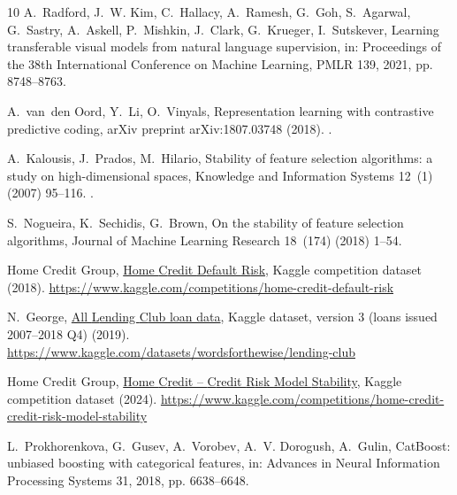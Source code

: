 \documentclass[final,5p,twocolumn]{elsarticle}
\begin{document}
\begin{thebibliography}{10}
A.~Radford, J.~W. Kim, C.~Hallacy, A.~Ramesh, G.~Goh, S.~Agarwal, G.~Sastry,
  A.~Askell, P.~Mishkin, J.~Clark, G.~Krueger, I.~Sutskever, Learning
  transferable visual models from natural language supervision, in: Proceedings
  of the 38th International Conference on Machine Learning, PMLR 139, 2021, pp.
  8748--8763.

A.~van~den Oord, Y.~Li, O.~Vinyals, Representation learning with contrastive
  predictive coding, arXiv preprint arXiv:1807.03748 (2018).
\newblock \href {https://doi.org/10.48550/arXiv.1807.03748}
  {}.

A.~Kalousis, J.~Prados, M.~Hilario, Stability of feature selection algorithms:
  a study on high-dimensional spaces, Knowledge and Information Systems 12~(1)
  (2007) 95--116.
\newblock \href {https://doi.org/10.1007/s10115-006-0040-8}
  {}.

S.~Nogueira, K.~Sechidis, G.~Brown, On the stability of feature selection
  algorithms, Journal of Machine Learning Research 18~(174) (2018) 1--54.

{Home Credit Group},
  \href{https://www.kaggle.com/competitions/home-credit-default-risk}{Home
  {C}redit {D}efault {R}isk}, Kaggle competition dataset (2018).
\newline\urlprefix\url{https://www.kaggle.com/competitions/home-credit-default-risk}

N.~George,
  \href{https://www.kaggle.com/datasets/wordsforthewise/lending-club}{All
  {L}ending {C}lub loan data}, Kaggle dataset, version 3 (loans issued
  2007--2018 Q4) (2019).
\newline\urlprefix\url{https://www.kaggle.com/datasets/wordsforthewise/lending-club}

{Home Credit Group},
  \href{https://www.kaggle.com/competitions/home-credit-credit-risk-model-stability}{Home
  {C}redit -- {C}redit {R}isk {M}odel {S}tability}, Kaggle competition dataset
  (2024).
\newline\urlprefix\url{https://www.kaggle.com/competitions/home-credit-credit-risk-model-stability}

L.~Prokhorenkova, G.~Gusev, A.~Vorobev, A.~V. Dorogush, A.~Gulin, {CatBoost}:
  unbiased boosting with categorical features, in: Advances in Neural
  Information Processing Systems 31, 2018, pp. 6638--6648.


\end{thebibliography}
\end{document}
